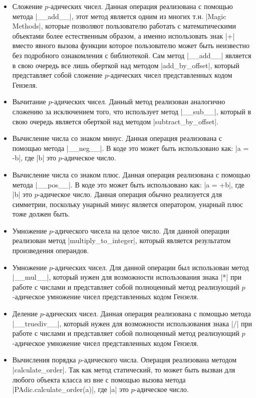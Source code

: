 \documentclass[master, och, diploma, times]{sty/SCWorks}
\theoremstyle{plain}
\theoremstyle{definition}
\begin{document}
\begin{itemize}
 
\item Сложение $p$-адических чисел. Данная операция реализована с помощью метода |__add__|, этот метод является одним из многих т.н. |Magic Methods|, которые позволяют пользователю работать с математическими объектами более естественным образом, а именно использовать знак |+| вместо явного вызова функции которое пользователю может быть неизвестно без подробного ознакомления с библиотекой. Сам метод |__add__| является в свою очередь все лишь оберткой над методом |add_by_offset|, который представляет собой сложение $p$-адических чисел представленных кодом Гензеля.
\item Вычитание $p$-адических чисел. Данный метод реализован аналогично сложению за исключением того, что использует метод |__sub__|, который в свою очередь является оберткой над методом |subtract_by_offset|.
\item Вычисление числа со знаком минус. Данная операция реализована с помощью метода |__neg__|. В коде это может быть использовано как: |a = -b|, где |b| это $p$-адическое число.
\item Вычисление числа со знаком плюс. Данная операция реализована с помощью метода |__pos__|. В коде это может быть использовано как: |a = +b|, где |b| это $p$-адическое число. Данная операция обычно реализуется для симметрии, поскольку унарный минус является оператором, унарный плюс тоже должен быть.
\item Умножение $p$-адического чисела на целое число. Для данной операции реализован метод |multiply_to_integer|, который является результатом произведения операндов.
\item Умножение $p$-адических чисел. Для данной операции был использован метод |__mul__|, который нужен для возможности использования знака |*| при работе с числами и представляет собой полноценный метод реализующий $p$-адическое умножение чисел представленных кодом Гензеля.
\item Деление $p$-адических чисел. Данная операция реализована с помощью метода |__truediv__|, который нужен для возможности использования знака |/| при работе с числами и представляет собой полноценный метод реализующий $p$-адическое умножение чисел представленных кодом Гензеля.
\item Вычисления порядка $p$-адического числа. Операция реализована методом |calculate_order|. Так как метод статический, то может быть вызван для любого объекта класса из вне с помощью вызова метода \\ |PAdic.calculate_order(a)|, где |a| это $p$-адическое число.

\end{itemize}
\end{document}
